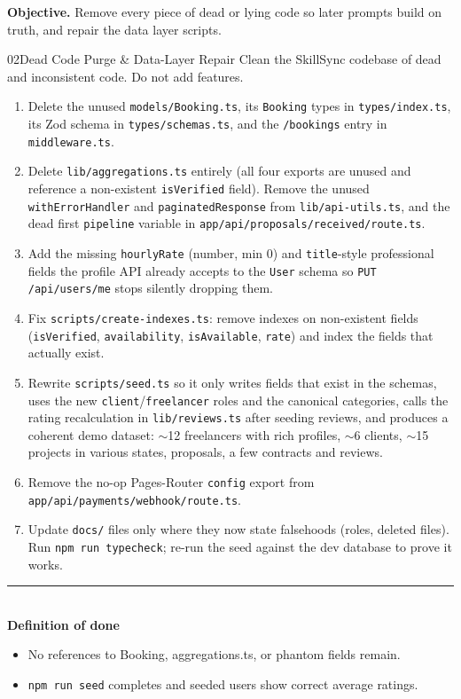 \documentclass[11pt,a4paper]{article}
\newcommand{\dod}{\medskip\noindent\textcolor{donegreen}{\rule{\linewidth}{0.5pt}}\\[1mm]\textbf{\textcolor{donegreen}{Definition of done}}\\[-2mm]}
\newcommand{\objective}[1]{\noindent\textbf{Objective.} #1\medskip}
\newcommand{\filepath}[1]{\texttt{#1}}
\begin{document}
\objective{Remove every piece of dead or lying code so later prompts build on
truth, and repair the data layer scripts.}

\begin{promptbox}{02}{Dead Code Purge \& Data-Layer Repair}
Clean the SkillSync codebase of dead and inconsistent code. Do not add features.

\begin{enumerate}[leftmargin=1.6em]
  \item Delete the unused \filepath{models/Booking.ts}, its \texttt{Booking} types in
        \filepath{types/index.ts}, its Zod schema in \filepath{types/schemas.ts}, and
        the \texttt{/bookings} entry in \filepath{middleware.ts}.
  \item Delete \filepath{lib/aggregations.ts} entirely (all four exports are unused
        and reference a non-existent \texttt{isVerified} field). Remove the unused
        \texttt{withErrorHandler} and \texttt{paginatedResponse} from
        \filepath{lib/api-utils.ts}, and the dead first \texttt{pipeline} variable in
        \filepath{app/api/proposals/received/route.ts}.
  \item Add the missing \texttt{hourlyRate} (number, min 0) and \texttt{title}-style
        professional fields the profile API already accepts to the \texttt{User}
        schema so \texttt{PUT /api/users/me} stops silently dropping them.
  \item Fix \filepath{scripts/create-indexes.ts}: remove indexes on non-existent
        fields (\texttt{isVerified}, \texttt{availability}, \texttt{isAvailable},
        \texttt{rate}) and index the fields that actually exist.
  \item Rewrite \filepath{scripts/seed.ts} so it only writes fields that exist in the
        schemas, uses the new \texttt{client}/\texttt{freelancer} roles and the
        canonical categories, calls the rating recalculation in
        \filepath{lib/reviews.ts} after seeding reviews, and produces a coherent demo
        dataset: $\sim$12 freelancers with rich profiles, $\sim$6 clients,
        $\sim$15 projects in various states, proposals, a few contracts and reviews.
  \item Remove the no-op Pages-Router \texttt{config} export from
        \filepath{app/api/payments/webhook/route.ts}.
  \item Update \filepath{docs/} files only where they now state falsehoods (roles,
        deleted files). Run \texttt{npm run typecheck}; re-run the seed against the dev
        database to prove it works.
\end{enumerate}

\dod
\begin{itemize}[leftmargin=1.6em]
  \item No references to Booking, aggregations.ts, or phantom fields remain.
  \item \texttt{npm run seed} completes and seeded users show correct average ratings.
\end{itemize}
\end{promptbox}
\end{document}
